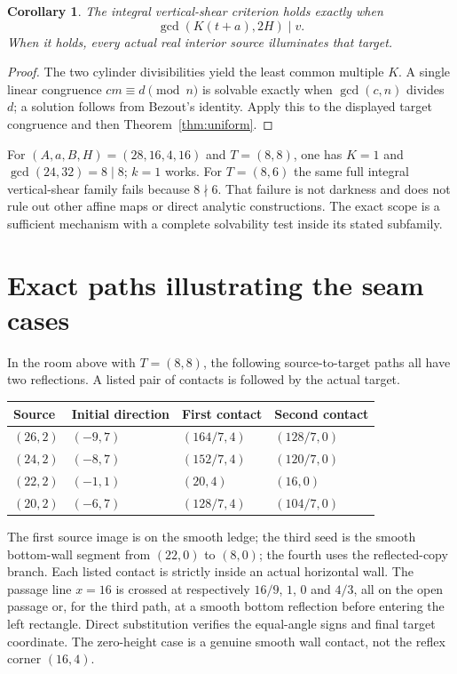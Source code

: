 \documentclass[11pt]{article}
\newtheorem{corollary}[theorem]{Corollary}
\theoremstyle{definition}
\begin{document}
\begin{corollary}\label{cor:gcd}
The integral vertical-shear criterion holds exactly when
\[
 \gcd(K(t+a),2H)\mid v.
\]
When it holds, every actual real interior source illuminates that target.
\end{corollary}
\begin{proof}
The two cylinder divisibilities yield the least common multiple $K$. A single linear congruence $cm\equiv d\pmod n$ is solvable exactly when $\gcd(c,n)$ divides $d$; a solution follows from Bezout's identity. Apply this to the displayed target congruence and then Theorem~\ref{thm:uniform}.
\end{proof}

For $(A,a,B,H)=(28,16,4,16)$ and $T=(8,8)$, one has $K=1$ and $\gcd(24,32)=8\mid8$; $k=1$ works. For $T=(8,6)$ the same full integral vertical-shear family fails because $8\nmid6$. That failure is not darkness and does not rule out other affine maps or direct analytic constructions. The exact scope is a sufficient mechanism with a complete solvability test inside its stated subfamily.

\section{Exact paths illustrating the seam cases}
In the room above with $T=(8,8)$, the following source-to-target paths all have two reflections. A listed pair of contacts is followed by the actual target.
\begin{center}\small
\begin{tabular}{@{}llll@{}}\toprule
Source & Initial direction & First contact & Second contact\\\midrule
$(26,2)$ &$(-9,7)$ &$(164/7,4)$ &$(128/7,0)$\\
$(24,2)$ &$(-8,7)$ &$(152/7,4)$ &$(120/7,0)$\\
$(22,2)$ &$(-1,1)$ &$(20,4)$ &$(16,0)$\\
$(20,2)$ &$(-6,7)$ &$(128/7,4)$ &$(104/7,0)$\\\bottomrule
\end{tabular}
\end{center}
The first source image is on the smooth ledge; the third seed is the smooth bottom-wall segment from $(22,0)$ to $(8,0)$; the fourth uses the reflected-copy branch. Each listed contact is strictly inside an actual horizontal wall. The passage line $x=16$ is crossed at respectively $16/9$, $1$, $0$ and $4/3$, all on the open passage or, for the third path, at a smooth bottom reflection before entering the left rectangle. Direct substitution verifies the equal-angle signs and final target coordinate. The zero-height case is a genuine smooth wall contact, not the reflex corner $(16,4)$.
\end{document}
